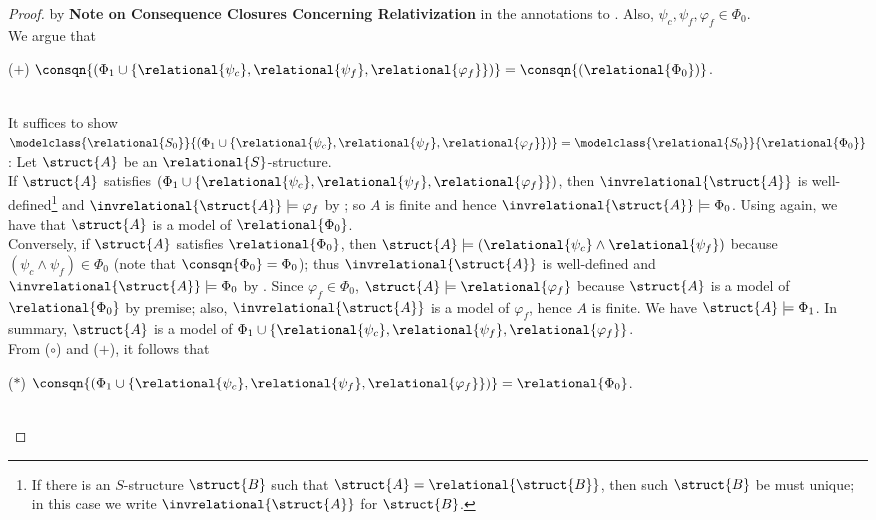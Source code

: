 \begin{enumerate}[1.]
\begin{asparaenum}[(1)]
\begin{proof}
by \textbf{Note on Consequence Closures Concerning Relativization} in the annotations to . Also, $\psi_c, \psi_f, \varphi_f \in \Phi_0$.\bigskip\\
We argue that\smallskip\\
\begin{quoteno}{($+$)}
$\consqn{(\Phi_1 \cup \{ \relational{\psi_c}, \relational{\psi_f}, \relational{\varphi_f} \})} = \consqn{(\relational{\Phi_0})}$.
\end{quoteno}\smallskip\\
It suffices to show $\modelclass{\relational{S_0}}{(\Phi_1 \cup \{ \relational{\psi_c}, \relational{\psi_f}, \relational{\varphi_f} \})} = \modelclass{\relational{S_0}}{\relational{\Phi_0}}$: Let $\struct{A}$ be an $\relational{S}$-structure.\medskip\\
If $\struct{A}$ satisfies $(\Phi_1 \cup \{ \relational{\psi_c}, \relational{\psi_f}, \relational{\varphi_f} \})$, then $\invrelational{\struct{A}}$ is well-defined\footnote{If there is an $S$-structure $\struct{B}$ such that $\struct{A} = \relational{\struct{B}}$, then such $\struct{B}$ be must unique; in this case we write $\invrelational{\struct{A}}$ for $\struct{B}$.} and $\invrelational{\struct{A}} \models \varphi_f$ by ; so $A$ is finite and hence $\invrelational{\struct{A}} \models \Phi_0$. Using  again, we have that $\struct{A}$ is a model of $\relational{\Phi_0}$.\medskip\\
Conversely, if $\struct{A}$ satisfies $\relational{\Phi_0}$, then $\struct{A} \models (\relational{\psi_c} \land \relational{\psi_f})$ because $(\psi_c \land \psi_f) \in \Phi_0$ (note that $\consqn{\Phi_0} = \Phi_0$); thus $\invrelational{\struct{A}}$ is well-defined and $\invrelational{\struct{A}} \models \Phi_0$ by . Since $\varphi_f \in \Phi_0$, $\struct{A} \models \relational{\varphi_f}$ because $\struct{A}$ is a model of $\relational{\Phi_0}$ by premise; also, $\invrelational{\struct{A}}$ is a model of $\varphi_f$, hence $A$ is finite. We have $\struct{A} \models \Phi_1$. In summary, $\struct{A}$ is a model of $\Phi_1 \cup \{ \relational{\psi_c}, \relational{\psi_f}, \relational{\varphi_f} \}$.\bigskip\\
From ($\circ$) and ($+$), it follows that\smallskip\\
\begin{quoteno}{($\ast$)}
$\consqn{(\Phi_1 \cup \{ \relational{\psi_c}, \relational{\psi_f}, \relational{\varphi_f} \})} = \relational{\Phi_0}$.
\end{quoteno}\bigskip\\

\end{proof}
\end{asparaenum}
\end{enumerate}
